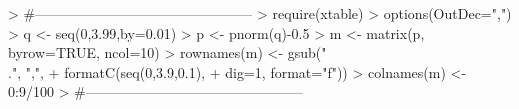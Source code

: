 \documentclass[14pt,aspectratio=1610]{beamer}
\begin{document}
\begin{frame}[fragile]{}
\frametitle{}
\begin{block}{}
\begin{Schunk}
\begin{Sinput}
> #-----------------------------------------------
> require(xtable)
> options(OutDec=",")
> q <- seq(0,3.99,by=0.01)
> p <- pnorm(q)-0.5
> m <- matrix(p, byrow=TRUE, ncol=10)
> rownames(m) <- gsub("\\.", ",", 
+                     formatC(seq(0,3.9,0.1),
+                             dig=1, format="f"))
> colnames(m) <- 0:9/100
> #-----------------------------------------------
\end{Sinput}
\end{Schunk}
\end{block}
\end{frame}

\begin{frame}[fragile]{}
\frametitle{}
\begin{block}{}
\begin{center}
\end{center}
\end{block}
\end{frame}
\end{document}
